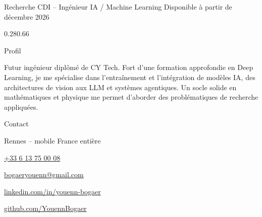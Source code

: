 \documentclass[a4paper]{resume} %
\begin{document}
        {Recherche CDI -- Ingénieur IA / Machine Learning}
        {Disponible à partir de décembre 2026}

\vspace{3mm}

\begin{rColumns}{0.28}{0.66}
\small

\begin{rLeftColSection}{Profil}
  {\fontsize{10pt}{12pt}\selectfont\setlength{\rightskip}{3mm}%
  Futur ingénieur diplômé de CY Tech. Fort d'une formation approfondie en
  Deep Learning, je me spécialise dans l'entraînement et l'intégration de
  modèles IA, des architectures de vision aux LLM et systèmes agentiques.
  Un socle solide en mathématiques et physique me permet d'aborder des
  problématiques de recherche appliquées.\par}
\end{rLeftColSection}

\begin{rLeftColSection}{Contact}
  \begin{rBullets}[0.2em]
    \item Rennes -- mobile France entière
    \item \href{tel:+33613750008}{+33 6 13 75 00 08}
    \item \href{mailto:bogaeryouenn@gmail.com}{bogaeryouenn@gmail.com}
    \item \href{https://www.linkedin.com/in/youenn-bogaer}{linkedin.com/in/youenn-bogaer}
    \item \href{https://github.com/YouennBogaer}{github.com/YouennBogaer}
  \end{rBullets}
\end{rLeftColSection}


\end{rColumns}
\end{document}
